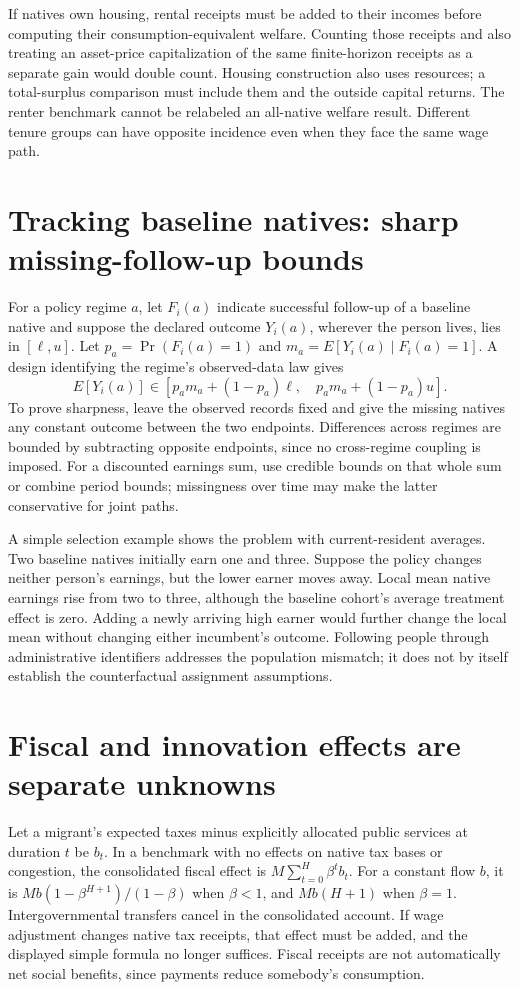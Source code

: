 \documentclass[11pt,a4paper]{article}
\begin{document}
If natives own housing, rental receipts must be added to their incomes before computing their consumption-equivalent welfare. Counting those receipts and also treating an asset-price capitalization of the same finite-horizon receipts as a separate gain would double count. Housing construction also uses resources; a total-surplus comparison must include them and the outside capital returns. The renter benchmark cannot be relabeled an all-native welfare result. Different tenure groups can have opposite incidence even when they face the same wage path.

\section{Tracking baseline natives: sharp missing-follow-up bounds}
For a policy regime $a$, let $F_i(a)$ indicate successful follow-up of a baseline native and suppose the declared outcome $Y_i(a)$, wherever the person lives, lies in $[\ell,u]$. Let $p_a=\Pr(F_i(a)=1)$ and $m_a=E[Y_i(a)\mid F_i(a)=1]$. A design identifying the regime's observed-data law gives
\[
 E[Y_i(a)]\in[p_am_a+(1-p_a)\ell,\quad p_am_a+(1-p_a)u]. \tag{5}
\]
To prove sharpness, leave the observed records fixed and give the missing natives any constant outcome between the two endpoints. Differences across regimes are bounded by subtracting opposite endpoints, since no cross-regime coupling is imposed. For a discounted earnings sum, use credible bounds on that whole sum or combine period bounds; missingness over time may make the latter conservative for joint paths.

A simple selection example shows the problem with current-resident averages. Two baseline natives initially earn one and three. Suppose the policy changes neither person's earnings, but the lower earner moves away. Local mean native earnings rise from two to three, although the baseline cohort's average treatment effect is zero. Adding a newly arriving high earner would further change the local mean without changing either incumbent's outcome. Following people through administrative identifiers addresses the population mismatch; it does not by itself establish the counterfactual assignment assumptions.

\section{Fiscal and innovation effects are separate unknowns}
Let a migrant's expected taxes minus explicitly allocated public services at duration $t$ be $b_t$. In a benchmark with no effects on native tax bases or congestion, the consolidated fiscal effect is $M\sum_{t=0}^H\beta^tb_t$. For a constant flow $b$, it is $Mb(1-\beta^{H+1})/(1-\beta)$ when $\beta<1$, and $Mb(H+1)$ when $\beta=1$. Intergovernmental transfers cancel in the consolidated account. If wage adjustment changes native tax receipts, that effect must be added, and the displayed simple formula no longer suffices. Fiscal receipts are not automatically net social benefits, since payments reduce somebody's consumption.
\end{document}
